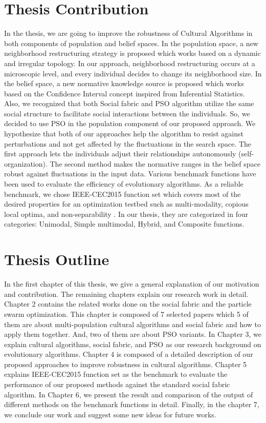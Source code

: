 \section{Thesis Contribution}
In the thesis, we are going to improve the robustness of Cultural Algorithms in both components of population and belief spaces. In the population space, a new neighborhood restructuring strategy is proposed which works based on a dynamic and irregular topology. In our approach, neighborhood restructuring occurs at a microscopic level, and every individual decides to change its neighborhood size. In the belief space, a new normative knowledge source is proposed which works based on the Confidence Interval concept inspired from Inferential Statistics. Also, we recognized that both Social fabric and PSO algorithm utilize the same social structure to facilitate social interactions between the individuals. So, we decided to use PSO in the population component of our proposed approach. We hypothesize that both of our approaches help the algorithm to resist against perturbations and not get affected by the fluctuations in the search space. The first approach lets the individuals adjust their relationships autonomously (self-organization). The second method makes the normative ranges in the belief space robust against fluctuations in the input data. \newline Various benchmark functions have been used to evaluate the efficiency of evolutionary algorithms. As a reliable benchmark, we chose IEEE-CEC2015 function set which covers most of the desired properties for an optimization testbed such as multi-modality, copious local optima, and non-separability \cite{chen2014problem}. In our thesis, they are categorized in four categories: Unimodal, Simple multimodal, Hybrid, and Composite functions.
\section{Thesis Outline}
In the first chapter of this thesis, we give a general explanation of our motivation and contribution. The remaining chapters explain our research work in detail. Chapter 2 contains the related works done on the social fabric and the particle swarm optimization. This chapter is composed of 7 selected papers which 5 of them are about multi-population cultural algorithms and social fabric and how to apply them together. And, two of them are about PSO variants. In Chapter 3, we explain cultural algorithms, social fabric, and PSO as our research background on evolutionary algorithms. Chapter 4 is composed of a detailed description of our proposed approaches to improve robustness in cultural algorithms. Chapter 5 explains IEEE-CEC2015 function set as the benchmark to evaluate the performance of our proposed methods against the standard social fabric algorithm. In Chapter 6, we present the result and comparison of the output of different methods on the benchmark functions in detail. Finally, in the chapter 7, we conclude our work and suggest some new ideas for future works.